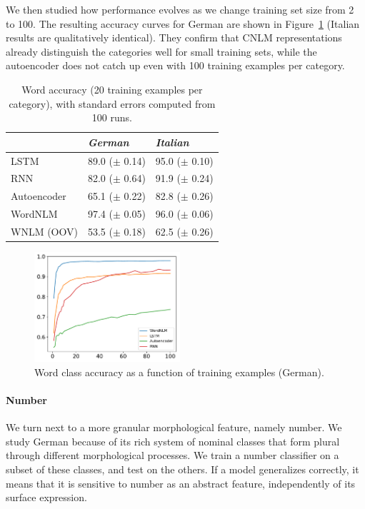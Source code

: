 We then studied how performance evolves as we change training set size from 2 to 100. The resulting accuracy curves for German are shown in Figure~\ref{fig:pos-induction} (Italian results are qualitatively identical). They confirm that CNLM representations already distinguish the categories well for small training sets, while the autoencoder does not catch up even with 100 training examples per category.

\begin{table}[t]
  \begin{center}
    \begin{tabular}{l|l|l}
   &\emph{German}&\emph{Italian}\\
      \hline
	    LSTM & 89.0 ($\pm$ 0.14) & 95.0 ($\pm$ 0.10) \\
	    RNN & 82.0 ($\pm$ 0.64) & 91.9 ($\pm$ 0.24) \\
	    Autoencoder & 65.1 ($\pm$ 0.22) & 82.8 ($\pm$ 0.26) \\
	    WordNLM & 97.4 ($\pm$ 0.05) & 96.0 ($\pm$ 0.06) \\
	    WNLM (OOV) & 53.5 ($\pm$ 0.18)  & 62.5 ($\pm$ 0.26) \\
    \end{tabular}
  \end{center}
  \caption{\label{tab:pos-results} Word  accuracy (20 training examples per category), with standard errors computed from 100 runs.}
\end{table}


\begin{figure}
\includegraphics[width=0.48\textwidth]{figures/german_pos_nouns_verbs.pdf}
	\caption{Word class accuracy as a function of training examples (German). }\label{fig:pos-induction}
\end{figure}





\paragraph{Number}
We turn next to a more granular morphological feature, namely
number. We study German because of its rich system of nominal classes
that form plural through different morphological processes. We train a
number classifier on a subset of these classes, and test on the
others. If a model generalizes correctly, it means that it is
sensitive to number as an abstract feature, independently of its
surface expression.

